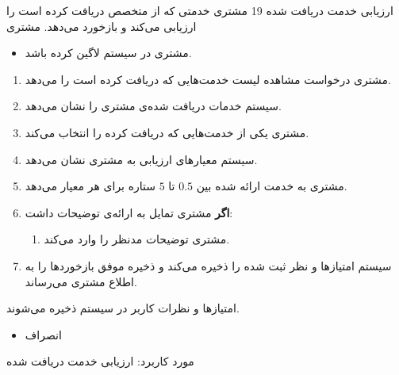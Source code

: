 {
\usecase
{
	ارزیابی خدمت دریافت شده
}
{19}
{
	مشتری خدمتی که از متخصص دریافت کرده است را ارزیابی می‌کند و بازخورد می‌دهد.
}
{
	مشتری
}
{}
{
		\begin{itemize}
		\vspace*{-0.6cm}
		\item 
		مشتری در سیستم لاگین کرده باشد. 
	\end{itemize}
}
{
	\vspace*{-0.6cm}
	\begin{enumerate}
		\item 
		مشتری درخواست مشاهده لیست خدمت‌‌هایی که دریافت کرده است را می‌دهد.
		 \item
		 سیستم خدمات دریافت شده‌ی مشتری را نشان می‌دهد.
		\item
		مشتری یکی از خدمت‌هایی که دریافت کرده را انتخاب می‌کند.

		\item
سیستم معیارهای ارزیابی  به مشتری نشان می‌دهد.
		\item 
مشتری به خدمت ارائه شده بین $0.5$ تا $5$ ستاره برای هر معیار می‌دهد.

			\item 
	\textbf{اگر} مشتری تمایل به ارائه‌ی توضیحات داشت:
				\begin{enumerate}[label=\theenumi.\arabic*.]
		\item 
		مشتری توضیحات مدنظر را وارد می‌کند. 
	\end{enumerate}
		\item
		سیستم امتیازها و نظر ثبت شده را ذخیره می‌کند و ذخیره موفق بازخوردها را به اطلاع مشتری می‌رساند.
		
	\end{enumerate}
}
{
امتیازها و نظرات کاربر در سیستم ذخیره می‌شوند.
}
{
	\begin{itemize}
		\vspace*{-0.6cm}
		\item 
		انصراف
	\end{itemize}
}
{
	مورد کاربرد: ارزیابی خدمت دریافت شده
}





}
